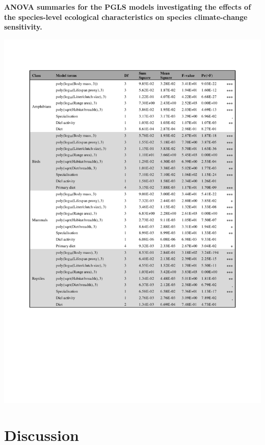 \begin{table}[h!]
\centering
\caption[ANOVA summaries for the PGLS models investigating the effects of the species-level ecological characteristics on species climate-change sensitivity.]{\textbf{ANOVA summaries for the PGLS models investigating the effects of the species-level ecological characteristics on species climate-change sensitivity.}}
\includegraphics[scale=1, trim={2cm 5 1 2cm}, clip]{figures/Chapter4/Table_ANOVA_PGLS_pdf}
\label{chap4_table2}
\end{table}


\clearpage

\section{Discussion}
